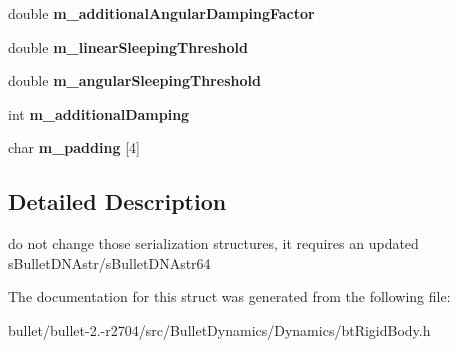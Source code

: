 \begin{DoxyCompactItemize}
\item 
\hypertarget{structbt_rigid_body_double_data_ab42de75f7560857bb87ede0d66ed8d64}{double {\bfseries m\+\_\+additional\+Angular\+Damping\+Factor}}\label{structbt_rigid_body_double_data_ab42de75f7560857bb87ede0d66ed8d64}

\item 
\hypertarget{structbt_rigid_body_double_data_ac26e360a7ac8e2adf7dd5df45251c5da}{double {\bfseries m\+\_\+linear\+Sleeping\+Threshold}}\label{structbt_rigid_body_double_data_ac26e360a7ac8e2adf7dd5df45251c5da}

\item 
\hypertarget{structbt_rigid_body_double_data_a829fdfb504f92df1831f12cd370edaca}{double {\bfseries m\+\_\+angular\+Sleeping\+Threshold}}\label{structbt_rigid_body_double_data_a829fdfb504f92df1831f12cd370edaca}

\item 
\hypertarget{structbt_rigid_body_double_data_acbff8b965e68814aa5f376a51f1e233c}{int {\bfseries m\+\_\+additional\+Damping}}\label{structbt_rigid_body_double_data_acbff8b965e68814aa5f376a51f1e233c}

\item 
\hypertarget{structbt_rigid_body_double_data_a8f730ad7c22c76ce6e70ac4791f1afd4}{char {\bfseries m\+\_\+padding} \mbox{[}4\mbox{]}}\label{structbt_rigid_body_double_data_a8f730ad7c22c76ce6e70ac4791f1afd4}

\end{DoxyCompactItemize}


\subsection{Detailed Description}
do not change those serialization structures, it requires an updated s\+Bullet\+D\+N\+Astr/s\+Bullet\+D\+N\+Astr64 

The documentation for this struct was generated from the following file\+:\begin{DoxyCompactItemize}
\item 
bullet/bullet-\/2.-\/r2704/src/\+Bullet\+Dynamics/\+Dynamics/bt\+Rigid\+Body.\+h\end{DoxyCompactItemize}
